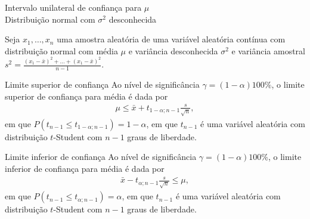\documentclass[8pt]{beamer}
\begin{document}
\begin{frame}{Intervalo unilateral de confiança para $\mu$\\ Distribuição normal com $\sigma^2$ desconhecida}


Seja $x_1, \dots, x_n$ uma amostra aleatória de uma variável aleatória contínua com distribuição normal com média $\mu$ e variância desconhecida $\sigma^2$ e variância amostral $s^2 = \frac{(x_1 - \bar{x})^2 + \dots + (x_1 - \bar{x})^2}{n-1}$. 

\begin{block}{Limite superior de confiança}
	Ao nível de significância $\gamma=(1-\alpha)100\%$, o limite superior de confiança para média é dada por
	\begin{align*}
	\mu \leq \bar{x} + t_{1-\alpha;n-1} \frac{s}{\sqrt{n}},
	\end{align*}
	em que $P\left( t_{n-1} \leq t_{1-\alpha;n-1} \right) = 1-\alpha$, em que $t_{n-1}$ é uma variável aleatória com distribuição $t$-Student com $n-1$ graus de liberdade.
	
\end{block}

\begin{block}{Limite inferior de confiança}
	Ao nível de significância $\gamma=(1-\alpha)100\%$, o limite inferior de confiança para média é dada por
	\begin{align*}
	\bar{x} - t_{\alpha;n-1} \frac{s}{\sqrt{n}} \leq \mu,
	\end{align*}
	em que $P\left( t_{n-1} \leq t_{\alpha;n-1} \right) = \alpha$, em que $t_{n-1}$ é uma variável aleatória com distribuição $t$-Student com $n-1$ graus de liberdade.
\end{block}



\end{frame}
\end{document}

